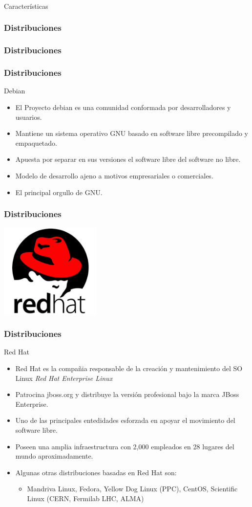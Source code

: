 \frame
{
\frametitle{}
\begin{center}
	\Huge{Características}
\end{center}
}
\frame
{
\frametitle{Distribuciones}
\begin{center}
\end{center}
}

\frame
{
\frametitle{Distribuciones}
\vspace{1cm}
\begin{center}
\end{center}
}

\frame
{
\frametitle{Distribuciones}
\Large{Debian}
\normalsize
\begin{itemize}
	\item El Proyecto debian es una comunidad conformada por desarrolladores y usuarios.
	\item Mantiene un sistema operativo GNU basado en software libre precompilado y empaquetado.
	\item Apuesta por separar en sus versiones el software libre del software no libre.
	\item Modelo de desarrollo ajeno a motivos empresariales o comerciales.
	\item El principal orgullo de GNU.
\end{itemize}
}

\frame
{
\frametitle{Distribuciones}
\vspace{1cm}
\begin{center}
	\includegraphics[width=5cm]{img/redhat}
\end{center}
}

\frame
{
\frametitle{Distribuciones}
\Large{Red Hat}
\normalsize
\begin{itemize}
	\item Red Hat es la compañia responsable de la creación y mantenimiento del SO Linux \emph{Red Hat Enterprise Linux}
	\item Patrocina jboss.org y distribuye la versión profesional bajo la marca JBoss Enterprise.
	\item Uno de las principales entedidades esforzada en apoyar el movimiento del software libre.
	\item Poseen una amplia infraestructura con 2,000 empleados en 28 lugares del mundo aproximadamente.
	\item Algunas otras distribuciones basadas en Red Hat son:
	\begin{itemize}
		\item Mandriva Linux, Fedora, Yellow Dog Linux (PPC), CentOS, Scientific Linux (CERN, Fermilab LHC, ALMA)
	\end{itemize}
\end{itemize}
}


